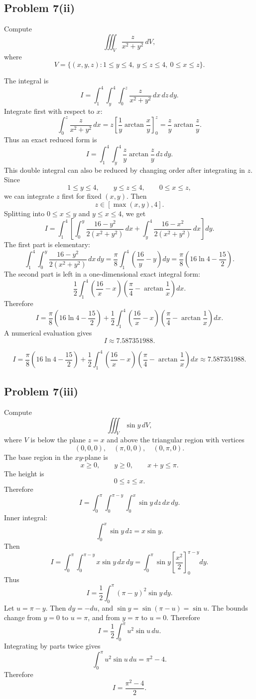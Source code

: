 \documentclass[11pt,a4paper]{article}
\begin{document}
\subsection{Problem 7(ii)}
Compute
\[
 \iiint_V \frac{z}{x^2+y^2}\,dV,
\]
where
\[
 V=\{(x,y,z):1\le y\le4,
\ y\le z\le4,
\ 0\le x\le z\}.
\]

The integral is
\[
 I=\int_1^4\int_y^4\int_0^z\frac{z}{x^2+y^2}\,dx\,dz\,dy.
\]
Integrate first with respect to \(x\):
\[
 \int_0^z\frac{z}{x^2+y^2}\,dx
 =z\left[\frac1y\arctan\frac{x}{y}\right]_0^z
 =\frac{z}{y}\arctan\frac{z}{y}.
\]
Thus an exact reduced form is
\[
 I=\int_1^4\int_y^4\frac{z}{y}\arctan\frac{z}{y}\,dz\,dy.
\]
This double integral can also be reduced by changing order after integrating in \(z\).  Since
\[
 1\le y\le4,
\qquad y\le z\le4,
\qquad 0\le x\le z,
\]
we can integrate \(z\) first for fixed \((x,y)\).  Then
\[
 z\in[\max(x,y),4].
\]
Splitting into \(0\le x\le y\) and \(y\le x\le4\), we get
\[
 I=\int_1^4\left[\int_0^y\frac{16-y^2}{2(x^2+y^2)}\,dx
 +\int_y^4\frac{16-x^2}{2(x^2+y^2)}\,dx\right]dy.
\]
The first part is elementary:
\[
 \int_1^4\int_0^y\frac{16-y^2}{2(x^2+y^2)}\,dx\,dy
 =\frac\pi8\int_1^4\left(\frac{16}{y}-y\right)dy
 =\frac\pi8\left(16\ln4-\frac{15}{2}\right).
\]
The second part is left in a one-dimensional exact integral form:
\[
 \frac12\int_1^4\left(\frac{16}{x}-x\right)\left(\frac\pi4-\arctan\frac1x\right)dx.
\]
Therefore
\[
 I=\frac\pi8\left(16\ln4-\frac{15}{2}\right)
 +\frac12\int_1^4\left(\frac{16}{x}-x\right)\left(\frac\pi4-\arctan\frac1x\right)dx.
\]
A numerical evaluation gives
\[
 I\approx 7.587351988.
\]

\begin{answerbox}
\[
\boxed{I=\frac\pi8\left(16\ln4-\frac{15}{2}\right)
 +\frac12\int_1^4\left(\frac{16}{x}-x\right)\left(\frac\pi4-\arctan\frac1x\right)dx
 \approx7.587351988.}
\]
\end{answerbox}

\subsection{Problem 7(iii)}
Compute
\[
 \iiint_V\sin y\,dV,
\]
where \(V\) is below the plane \(z=x\) and above the triangular region with vertices
\[
 (0,0,0),\quad(\pi,0,0),\quad(0,\pi,0).
\]
The base region in the \(xy\)-plane is
\[
 x\ge0,
\qquad y\ge0,
\qquad x+y\le\pi.
\]
The height is
\[
 0\le z\le x.
\]
Therefore
\[
 I=\int_0^\pi\int_0^{\pi-y}\int_0^x\sin y\,dz\,dx\,dy.
\]
Inner integral:
\[
 \int_0^x\sin y\,dz=x\sin y.
\]
Then
\[
 I=\int_0^\pi\int_0^{\pi-y}x\sin y\,dx\,dy
 =\int_0^\pi\sin y\left[\frac{x^2}{2}\right]_0^{\pi-y}dy.
\]
Thus
\[
 I=\frac12\int_0^\pi(\pi-y)^2\sin y\,dy.
\]
Let \(u=\pi-y\).  Then \(dy=-du\), and \(\sin y=\sin(\pi-u)=\sin u\).  The bounds change from \(y=0\) to \(u=\pi\), and from \(y=\pi\) to \(u=0\).  Therefore
\[
 I=\frac12\int_0^\pi u^2\sin u\,du.
\]
Integrating by parts twice gives
\[
 \int_0^\pi u^2\sin u\,du=\pi^2-4.
\]
Therefore
\[
\boxed{I=\frac{\pi^2-4}{2}.}
\]
\end{document}
